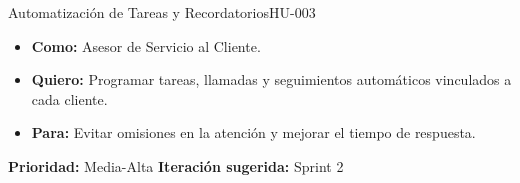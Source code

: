 \begin{UserStoryBox}{Automatización de Tareas y Recordatorios}{HU-003}
    \sffamily
    \begin{itemize}[label=\textcolor{SecondarySteel}{\textbullet}]
        \item \textbf{Como:} Asesor de Servicio al Cliente.
        \item \textbf{Quiero:} Programar tareas, llamadas y seguimientos automáticos vinculados a cada cliente.
        \item \textbf{Para:} Evitar omisiones en la atención y mejorar el tiempo de respuesta.
    \end{itemize}
    \tcblower
    \small\textcolor{MutedText}{\textbf{Prioridad:} Media-Alta \hfill \textbf{Iteración sugerida:} Sprint 2}
\end{UserStoryBox}
